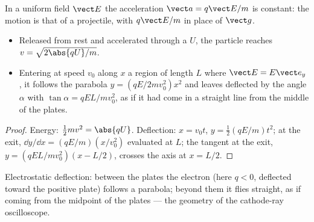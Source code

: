 \begin{proposition}\label{prop:b1:charged-particles:efield}
In a uniform field $\vect E$ the acceleration $\vect a = q\vect E/m$ is
constant: the motion is that of a projectile, with $q\vect E/m$ in place
of $\vect g$.
\begin{itemize}
  \item Released from rest and accelerated through a  $U$, the
        particle reaches $v = \sqrt{2\abs{qU}/m}$.
  \item Entering at speed $v_0$ along $x$ a region of length $L$ where
        $\vect E = E\vect e_y$, it follows the parabola $y = (qE/2mv_0^2)x^2$
        and leaves deflected by the angle $\alpha$ with $\tan\alpha =
        qEL/mv_0^2$, as if it had come in a straight line from the
        middle of the plates.
\end{itemize}
\end{proposition}

\begin{proof}
Energy: $\tfrac12 mv^2 = \abs{qU}$. Deflection: $x = v_0t$, $y =
\tfrac12(qE/m)t^2$; at the exit, $\dd y/\dd x = (qE/m)(x/v_0^2)$ evaluated
at $L$; the tangent at the exit, $y = (qEL/mv_0^2)(x - L/2)$, crosses the
axis at $x = L/2$.
\end{proof}

\begin{omfigure}

{\small Electrostatic deflection: between the plates the electron (here
$q < 0$, deflected toward the positive plate) follows a parabola; beyond
them it flies straight, as if coming from the midpoint of the plates
--- the geometry of the cathode-ray oscilloscope.}
\end{omfigure}

